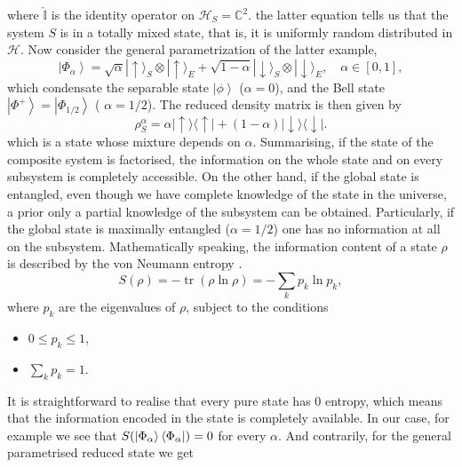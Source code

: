 where $\hat{\mathbb{I}}$ is the identity operator on $\mathcal{H}_S=\mathbb{C}^2$. the latter equation tells us that the system $S$ is in a totally mixed state, that is, it is uniformly random distributed in $\mathcal{H}$.
\newline
Now consider the general parametrization of the latter example,
\begin{equation}
\left|\Phi_{\alpha}\right\rangle=\sqrt{\alpha}|\uparrow\rangle_{S} \otimes|\uparrow\rangle_{E}+\sqrt{1-\alpha}|\downarrow\rangle_{S} \otimes|\downarrow\rangle_{E}, \quad \alpha \in[0,1],
\label{CH1:Entanglement_example_4}
\end{equation}
which condensate the separable state $\left|\phi\right\rangle$ ($\alpha=0$), and the Bell state$\left|\Phi^{+}\right\rangle=\left|\Phi_{1 / 2}\right\rangle$ ( $\alpha=1/2$). The reduced density matrix is then given by
\begin{equation}
\rho_{S}^{\alpha}=\alpha|\uparrow\rangle\langle\uparrow|+(1-\alpha)| \downarrow\rangle\langle\downarrow|.
\label{CH1:Entanglement_example_5}
\end{equation}
which is a state whose mixture depends on $\alpha$.
\newline
Summarising, if the state of the composite system is factorised, the information on the whole state and on every subsystem is completely accessible. On the other hand, if the global state is entangled, even though we have complete knowledge of the state in the universe, a prior only a partial knowledge of the subsystem can be obtained. Particularly, if the global state is maximally entangled ($\alpha=1/2$) one has no information at all on the subsystem.
Mathematically speaking, the information content of a state $\rho$ is described by the von Neumann entropy \cite{von_neumann_mathematical_1955}.
\begin{equation}
S(\rho)=-\operatorname{tr}(\rho \ln \rho)=-\sum_{k} p_{k} \ln p_{k},
\label{CH1:von_neumann_entropy}
\end{equation}
where $p_k$ are the eigenvalues of $\rho$, subject to the conditions
\begin{itemize}
\item $0\leq p_k\leq 1$,
\item $\sum_{k} p_k =1$.
\end{itemize}
It is straightforward to realise that every pure state has $0$ entropy, which means that the information encoded in the state is completely available. In our case, for example we see that $S(\mathinner{|{\Phi_\alpha}\rangle}\mathinner{\langle{\Phi_\alpha}|})=0$ for every $\alpha$. And contrarily, for the general parametrised reduced state we get
